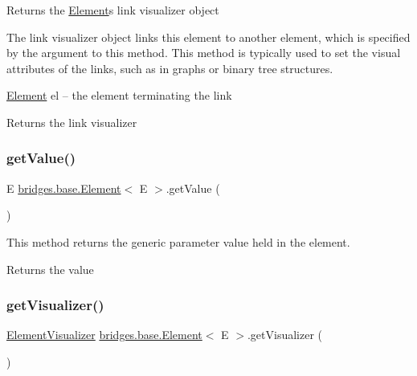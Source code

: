 Returns the \mbox{\hyperlink{classbridges_1_1base_1_1_element}{Element}}\textquotesingle{}s link visualizer object

The link visualizer object links this element to another element, which is specified by the argument to this method. This method is typically used to set the visual attributes of the links, such as in graphs or binary tree structures.

\mbox{\hyperlink{classbridges_1_1base_1_1_element}{Element}} el -- the element terminating the link

\begin{DoxyReturn}{Returns}
the link visualizer 
\end{DoxyReturn}
\mbox{\label{classbridges_1_1base_1_1_element_a44ddc61db34b6cf0bab7dfba667d54af}} 
\subsubsection{\texorpdfstring{get\+Value()}{getValue()}}
{\footnotesize\ttfamily E \mbox{\hyperlink{classbridges_1_1base_1_1_element}{bridges.\+base.\+Element}}$<$ E $>$.get\+Value (\begin{DoxyParamCaption}{ }\end{DoxyParamCaption})}

This method returns the generic parameter value held in the element.

\begin{DoxyReturn}{Returns}
the value 
\end{DoxyReturn}
\mbox{\label{classbridges_1_1base_1_1_element_a42c84d41dfb7bd05a586e303cb33de72}} 
\subsubsection{\texorpdfstring{get\+Visualizer()}{getVisualizer()}}
{\footnotesize\ttfamily \mbox{\hyperlink{classbridges_1_1base_1_1_element_visualizer}{Element\+Visualizer}} \mbox{\hyperlink{classbridges_1_1base_1_1_element}{bridges.\+base.\+Element}}$<$ E $>$.get\+Visualizer (\begin{DoxyParamCaption}{ }\end{DoxyParamCaption})}

